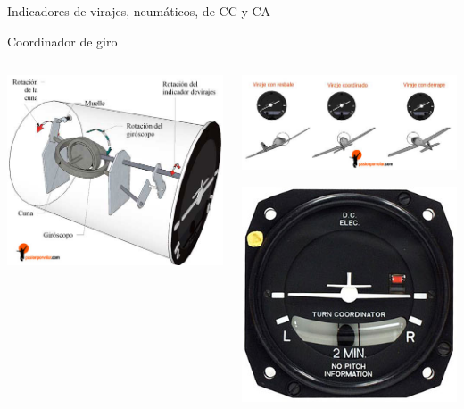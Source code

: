 \begin{frame}{Indicadores de virajes, neum\'aticos, de CC y CA}

  \begin{block}{Coordinador de giro}
    \begin{columns}
      \begin{column}{0.45\textwidth}
        \includegraphics[width=\linewidth]{05.instrumentos.giroscopicos.imagenes/05.02.indicadores.viraje.imagenes/coordinador-de-virajes-1.jpg}
      \end{column}
      \begin{column}{0.45\textwidth}
        \includegraphics[width=\linewidth]{05.instrumentos.giroscopicos.imagenes/05.02.indicadores.viraje.imagenes/coordinador-de-virajes-2.jpg}

        \includegraphics[width=0.4\linewidth]{05.instrumentos.giroscopicos.imagenes/05.02.indicadores.viraje.imagenes/coordinador_viraje.jpg}
      \end{column}


\end{columns}
\end{block}
\end{frame}
